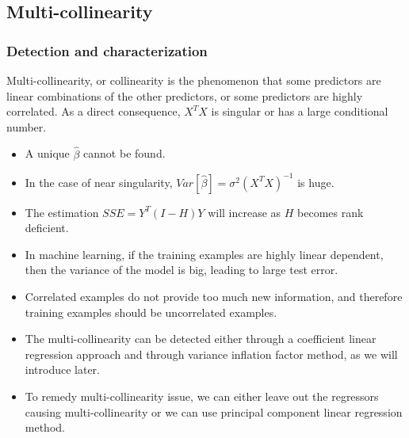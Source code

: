 \begin{refsection}
\subsection{Multi-collinearity}
\subsubsection{Detection and characterization}
\begin{definition}
	Multi-collinearity, or collinearity is the phenomenon that some predictors are linear combinations of the other predictors, or some predictors are highly correlated. As a direct consequence, $X^TX$ is singular or has a large conditional number.
\end{definition}


\begin{remark}\hfill
	\begin{itemize}
		\item A unique $\hat{\beta}$ cannot be found.
		\item In the case of near singularity, $Var[\hat{\beta}] = \sigma^2(X^TX)^{-1}$ is huge.
		\item The estimation $SSE = Y^T(I-H)Y$ will increase as $H$ becomes rank deficient.
	\end{itemize}
\end{remark}


\begin{remark}\hfill
	\begin{itemize}
		\item In machine learning, if the training examples are highly linear dependent, then the variance of the model is big, leading to large test error.
		\item Correlated examples do not provide too much new information, and therefore training examples should be uncorrelated examples. 
	\end{itemize}
\end{remark}

\begin{remark}\hfill
\begin{itemize}
	\item The multi-collinearity can be detected either through a coefficient linear regression approach and through variance inflation factor method, as we will introduce later. 
	\item To remedy multi-collinearity issue, we can either leave out the regressors causing multi-collinearity or we can use principal component linear regression method. 
\end{itemize}
\end{remark}



\end{refsection}
